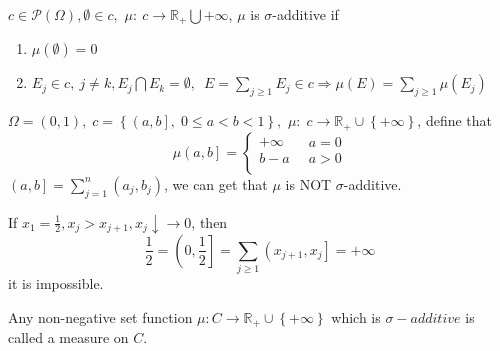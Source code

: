 \begin{definition}
	$ c \in \mathcal{P}\left(\Omega\right), \emptyset \in c, $ $ \mu: \  c \to \mathbb{R}_{+} \bigcup {+ \infty }$, $ \mu $ is $ \sigma $-additive if  
	\begin{enumerate}
		\item $\mu \left( \emptyset  \right) = 0$
		\item ${E_j}\in c, \ j \ne k, E_{j} \bigcap E_{k} = \emptyset,\ \;E = \sum\limits_{j \ge  1} {{E_j}}  \in c \Rightarrow \mu \left( E \right) = \sum\limits_{j \ge 1} {\mu \left( {{E_j}} \right)} $
	\end{enumerate}
\end{definition}

\begin{example}
	$\Omega  = \left( {0,1} \right),\;c = \left\{ {\left( {a,b} \right],\;0 \leqslant a < b < 1} \right\},$ $\mu :\;c \to {\mathbb{R}_ + } \cup \left\{ { + \infty } \right\}$,  define that
	\begin{equation}
	\mu \left( {a,b} \right] = \left\{ {\begin{matrix}
		{ + \infty }  \\ 
		{b - a}  \\ 	
		\end{matrix} } \right.\;\;\begin{matrix}
	{a = 0}  \\ 
	{a > 0}  \\ 
	\end{matrix} 
	\end{equation}
	$\left( {a,b} \right] = \sum\limits_{j = 1}^n {\left( {{a_j},{b_j}} \right)} $,  we can get that  $ \mu $ is NOT $ \sigma $-additive.
	
	If  $ {x_1} = \frac{1}{2},{x_j} > {x_{j + 1}},{x_j} \downarrow  \to 0 $, then 
	\begin{equation}
	\frac{1}{2} = \left( {0,\frac{1}{2}} \right] = \sum\limits_{j \geqslant 1} {\left( {{x_{j + 1}},{x_j}} \right]}  =  + \infty 
	\end{equation}
	it is impossible.
\end{example}

\begin{definition}
	Any non-negative set function $\mu :C \to {{\mathbb{R}}_ + } \cup \left\{ { + \infty } \right\}$ which is $ \sigma-additive $ is called a measure on $ C $.
	\label{def2.8}
\end{definition}

